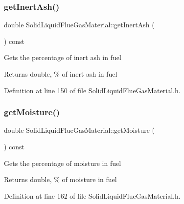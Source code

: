 \subsubsection{\texorpdfstring{get\+Inert\+Ash()}{getInertAsh()}\hspace{0.1cm}{\footnotesize\ttfamily [3/3]}}
{\footnotesize\ttfamily double Solid\+Liquid\+Flue\+Gas\+Material\+::get\+Inert\+Ash (\begin{DoxyParamCaption}{ }\end{DoxyParamCaption}) const\hspace{0.3cm}{\ttfamily [inline]}}

Gets the percentage of inert ash in fuel \begin{DoxyReturn}{Returns}
double, \% of inert ash in fuel 
\end{DoxyReturn}


Definition at line 150 of file Solid\+Liquid\+Flue\+Gas\+Material.\+h.

\mbox{\label{class_solid_liquid_flue_gas_material_accf3c8be942d0ba244f6eabab6e7012b}} 
\subsubsection{\texorpdfstring{get\+Moisture()}{getMoisture()}\hspace{0.1cm}{\footnotesize\ttfamily [1/3]}}
{\footnotesize\ttfamily double Solid\+Liquid\+Flue\+Gas\+Material\+::get\+Moisture (\begin{DoxyParamCaption}{ }\end{DoxyParamCaption}) const\hspace{0.3cm}{\ttfamily [inline]}}

Gets the percentage of moisture in fuel \begin{DoxyReturn}{Returns}
double, \% of moisture in fuel 
\end{DoxyReturn}


Definition at line 162 of file Solid\+Liquid\+Flue\+Gas\+Material.\+h.

\mbox{\label{class_solid_liquid_flue_gas_material_accf3c8be942d0ba244f6eabab6e7012b}} 
